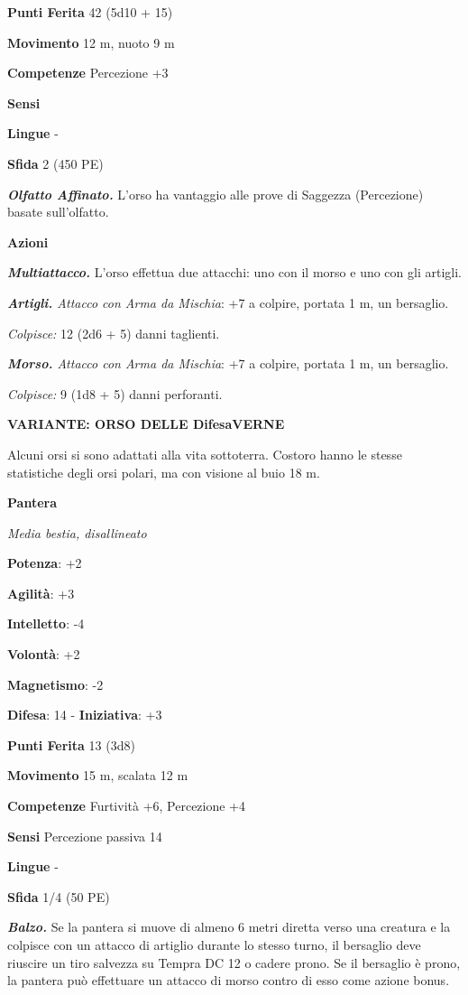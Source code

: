 \begin{multicols}{2}
\textbf{Punti Ferita} 42 (5d10 + 15)

\textbf{Movimento} 12 m, nuoto 9 m

\textbf{Competenze} Percezione +3

\textbf{Sensi} 

\textbf{Lingue} -

\textbf{Sfida} 2 (450 PE)\smallskip

\emph{\textbf{Olfatto Affinato.}} L'orso ha vantaggio alle prove di
Saggezza (Percezione) basate sull'olfatto.

\smallskip\textbf{Azioni}

\emph{\textbf{Multiattacco.}} L'orso effettua due attacchi: uno con il
morso e uno con gli artigli.

\emph{\textbf{Artigli.} Attacco con Arma da Mischia}: +7 a colpire,
portata 1 m, un bersaglio.

\emph{Colpisce:} 12 (2d6 + 5) danni taglienti.

\emph{\textbf{Morso.} Attacco con Arma da Mischia}: +7 a colpire,
portata 1 m, un bersaglio.

\emph{Colpisce:} 9 (1d8 + 5) danni perforanti.

\textbf{VARIANTE: ORSO DELLE DifesaVERNE}

Alcuni orsi si sono adattati alla vita sottoterra. Costoro hanno le
stesse statistiche degli orsi polari, ma con visione al buio 18 m.

\textbf{Pantera}

\emph{Media bestia, disallineato}

\textbf{Potenza}: +2

\textbf{Agilità}: +3

\textbf{Intelletto}: -4

\textbf{Volontà}: +2

\textbf{Magnetismo}: -2

\textbf{Difesa}: 14 - \textbf{Iniziativa}: +3

\textbf{Punti Ferita} 13 (3d8)

\textbf{Movimento} 15 m, scalata 12 m

\textbf{Competenze} Furtività +6, Percezione +4

\textbf{Sensi} Percezione passiva 14

\textbf{Lingue} -

\textbf{Sfida} 1/4 (50 PE)\smallskip

\emph{\textbf{Balzo.}} Se la pantera si muove di almeno 6 metri diretta
verso una creatura e la colpisce con un attacco di artiglio durante lo
stesso turno, il bersaglio deve riuscire un tiro salvezza su Tempra DC 12
o cadere prono. Se il bersaglio è prono, la pantera può effettuare un
attacco di morso contro di esso come azione bonus.


\end{multicols}
